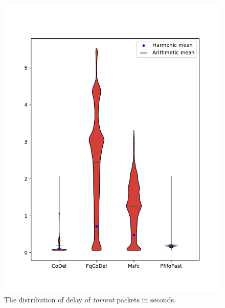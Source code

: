 \begin{figure}
	\centering
	\includegraphics[width=137mm]{drawings/type6-delay-down_A}
	\caption{The distribution of delay of \emph{torrent} packets in seconds.}
	\label{fig:torrent_delay}
\end{figure}



